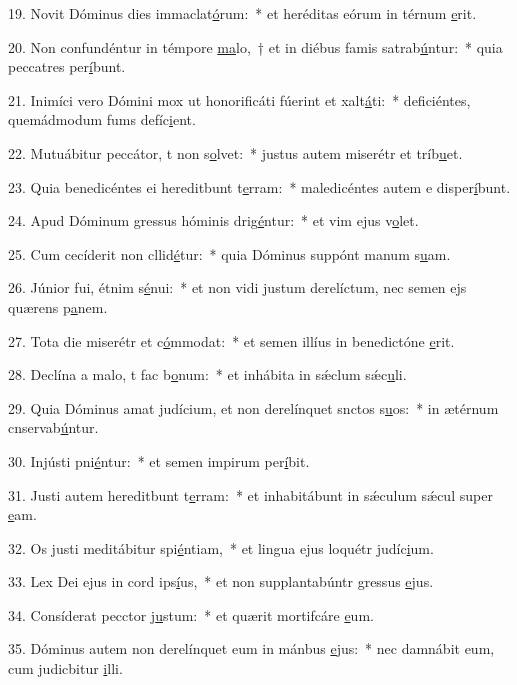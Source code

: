 19. Novit Dóminus dies immaclat\uline{ó}rum:~* et heréditas eórum in térnum \uline{e}rit.\par 
20. Non confundéntur in témpore \uline{ma}lo,~† et in diébus famis satrab\uline{ú}ntur:~* quia peccatres per\uline{í}bunt.\par 
21. Inimíci vero Dómini mox ut honorificáti fúerint et xalt\uline{á}ti:~* deficiéntes, quemádmodum fums defíc\uline{i}ent.\par 
22. Mutuábitur peccátor, t non s\uline{o}lvet:~* justus autem miserétr et tríb\uline{u}et.\par 
23. Quia benedicéntes ei hereditbunt t\uline{e}rram:~* maledicéntes autem e disper\uline{í}bunt.\par 
24. Apud Dóminum gressus hóminis drig\uline{é}ntur:~* et vim ejus v\uline{o}let.\par 
25. Cum cecíderit non cllid\uline{é}tur:~* quia Dóminus suppónt manum s\uline{u}am.\par 
26. Júnior fui, étnim s\uline{é}nui:~* et non vidi justum derelíctum, nec semen ejs quærens p\uline{a}nem.\par 
27. Tota die miserétr et c\uline{ó}mmodat:~* et semen illíus in benedictóne \uline{e}rit.\par 
28. Declína a malo, t fac b\uline{o}num:~* et inhábita in sǽclum sǽc\uline{u}li.\par 
29. Quia Dóminus amat judícium, et non derelínquet snctos s\uline{u}os:~* in ætérnum cnservab\uline{ú}ntur.\par 
30. Injústi pni\uline{é}ntur:~* et semen impirum per\uline{í}bit.\par 
31. Justi autem hereditbunt t\uline{e}rram:~* et inhabitábunt in sǽculum sǽcul super \uline{e}am.\par 
32. Os justi meditábitur spi\uline{é}ntiam,~* et lingua ejus loquétr judíc\uline{i}um.\par 
33. Lex Dei ejus in cord ips\uline{í}us,~* et non supplantabúntr gressus \uline{e}jus.\par 
34. Consíderat pecctor j\uline{u}stum:~* et quærit mortifcáre \uline{e}um.\par 
35. Dóminus autem non derelínquet eum in mánbus \uline{e}jus:~* nec damnábit eum, cum judicbitur \uline{i}lli.\par 
